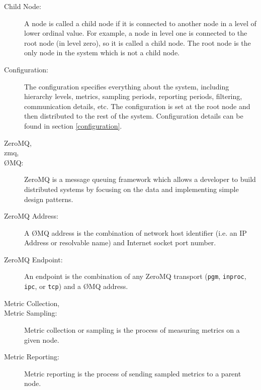 \begin{description}
\item[Child Node:]
A node is called a child node if it is connected to another node in a level of lower ordinal value. For example, a node
in level one is connected to the root node (in level zero), so it is called a child node. The root node is the only
node in the \dcamp system which is not a child node. 

\item[\dcamp Configuration:]
The \dcamp configuration specifies everything about the system, including hierarchy levels, metrics, sampling periods,
reporting periods, filtering, communication details, etc. The configuration is set at the root node and then
distributed to the rest of the \dcamp system. Configuration details can be found in section \ref{configuration}. 

\item[ZeroMQ,]
\item[zmq,]
\item[\O MQ:]
ZeroMQ is a message queuing framework which allows a developer to build distributed systems by focusing on the data
and implementing simple design patterns.

\item[ZeroMQ Address:]
A \O MQ address is the combination of network host identifier (i.e. an IP Address or resolvable name) and Internet
socket port number. 

\item[ZeroMQ Endpoint:]
An endpoint is the combination of any ZeroMQ transport (\texttt{pgm}, \texttt{inproc}, \texttt{ipc}, or \texttt{tcp})
and a \O MQ address.

\item[Metric Collection,]
\item[Metric Sampling:]
Metric collection or sampling is the process of measuring metrics on a given node. 

\item[Metric Reporting:]
Metric reporting is the process of sending sampled metrics to a parent node.

\end{description}

